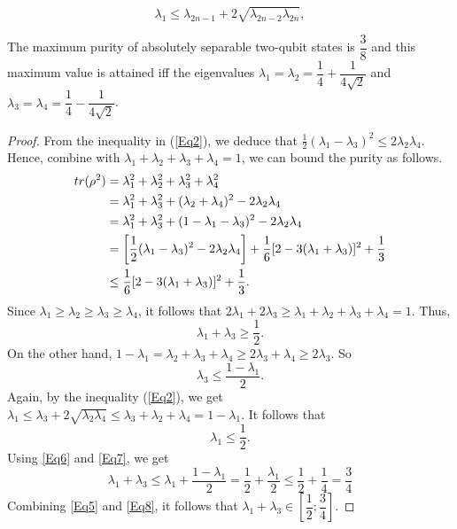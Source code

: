 \documentclass[10pt,a4paper]{amsart}
\begin{document}
\begin{equation}\label{Eq2}
	\lambda_1 \leq \lambda_{2n-1} + 2\sqrt{\lambda_{2n-2}\lambda_{2n}},
\end{equation}

\begin{theorem}\label{purity}
	The maximum purity of absolutely separable two-qubit states is $\dfrac{3}{8}$ and this maximum value is attained iff the  eigenvalues  $\lambda_1 = \lambda_2 = \dfrac{1}{4} + \dfrac{1}{4\sqrt{2}}$ and $\lambda_3 = \lambda_4=\dfrac{1}{4} - \dfrac{1}{4\sqrt{2}}$.
\end{theorem}

\begin{proof}
	From the inequality in (\ref{Eq2}), we deduce that $\frac{1}{2}(\lambda_1 - \lambda_3)^2\le 2\lambda_2\lambda_4$. Hence, combine with $\lambda_1 + \lambda_2 + \lambda_3 + \lambda_4 = 1$, we can bound the purity as follows.
	\begin{equation} \label{Eq4}
		\begin{aligned}
			{\rm tr}(\rho^2) &= \lambda_1^2 + \lambda_2^2 + \lambda_3^2 + \lambda_4^2\\ 
			&=\lambda_1^2 + \lambda_3^2 + (\lambda_2 + \lambda_4)^2 - 2\lambda_2\lambda_4\\
			&=\lambda_1^2 + \lambda_3^2 + (1 - \lambda_1 - \lambda_3)^2 - 2\lambda_2\lambda_4\\
			&= \left[\frac{1}{2}(\lambda_1 - \lambda_3)^2 - 2\lambda_2\lambda_4\right] + \frac{1}{6}[2 - 3(\lambda_1 + \lambda_3)]^2 + \frac{1}{3} \\
			&\le \frac{1}{6}[2 - 3(\lambda_1 + \lambda_3)]^2 + \frac{1}{3}. 
		\end{aligned}
	\end{equation}
	Since $\lambda_1 \ge \lambda_2\ge \lambda_3  \ge \lambda_4$, it follows that $2\lambda_1 + 2\lambda_3 \ge \lambda_1 + \lambda_2 + \lambda_3 + \lambda_4 = 1$. Thus, 
	\begin{equation}\label{Eq5}
		\lambda_1 + \lambda_3 \ge \frac{1}{2}.   	
	\end{equation}
	On the other hand, $1 - \lambda_1=\lambda_2 + \lambda_3 + \lambda_4 \ge 2\lambda_3 + \lambda_4 \ge 2\lambda_3$. So 
	\begin{equation}\label{Eq6}
		\lambda_3 \le \frac{1 - \lambda_1}{2}.	
	\end{equation}
	Again, by the inequality (\ref{Eq2}), we get $\lambda_1 \le \lambda_3 + 2\sqrt{\lambda_2\lambda_4} \le \lambda_3 + \lambda_2+\lambda_4 = 1 - \lambda_1$. It follows that 
	\begin{equation}\label{Eq7}
		\lambda_1 \le \frac{1}{2}.
	\end{equation}
	Using \eqref{Eq6} and \eqref{Eq7}, we get 
	\begin{equation}\label{Eq8}
		\lambda_1 + \lambda_3 \le \lambda_1 + \frac{1 - \lambda_1}{2} = \frac{1}{2} + \frac{\lambda_1}{2} \le \frac{1}{2} + \frac{1}{4} = \frac{3}{4}
	\end{equation}
	Combining \eqref{Eq5} and \eqref{Eq8}, it follows that $\lambda_1 + \lambda_3 \in \left[\dfrac{1}{2};\dfrac{3}{4}\right]$.
	

\end{proof}
\end{document}
